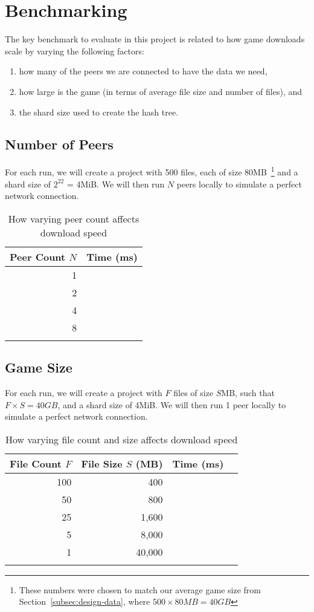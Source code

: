 
\section{Benchmarking}\label{sec:benchmark}

The key benchmark to evaluate in this project is related to how game downloads scale by varying the following factors:

\begin{enumerate}
  \item how many of the peers we are connected to have the data we need,
  \item how large is the game (in terms of average file size and number of files), and
  \item the shard size used to create the hash tree.
\end{enumerate}

\subsection*{Number of Peers}

For each run, we will create a project with 500 files, each of size 80MB~\footnote{These numbers were chosen to match our average game size from Section~\ref{subsec:design-data}, where $500\times 80MB = 40GB$} and a shard size of $2^{22}$ = 4MiB. We will then run $N$ peers locally to simulate a perfect network connection.

\begin{longtable}{ | r | r | }
  \hline
  \textbf{Peer Count $N$} & \textbf{Time (ms)} \\\hline
  1
  &
  \\\hline
  2
  &
  \\\hline
  4
  &
  \\\hline
  8
  &
  \\\hline
  \caption{How varying peer count affects download speed}
\end{longtable}

\subsection*{Game Size}

For each run, we will create a project with $F$ files of size $S$MB, such that $F\times S = 40GB$, and a shard size of 4MiB. We will then run 1 peer locally to simulate a perfect network connection.

\begin{longtable}{ | r | r | r | r | }
  \hline
  \textbf{File Count $F$} & \textbf{File Size $S$ (MB)} & \textbf{Time (ms)} \\\hline
  100
  & 400
  &
  \\\hline
  50
  & 800
  &
  \\\hline
  25
  & 1,600
  &
  \\\hline
  5
  & 8,000
  &
  \\\hline
  1
  & 40,000
  &
  \\\hline
  \caption{How varying file count and size affects download speed}
\end{longtable}

